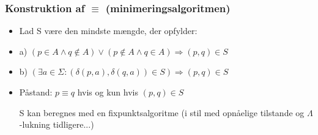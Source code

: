 \documentclass[]{beamer}
\begin{document}
\begin{frame}
\frametitle{Konstruktion af $\equiv$  (minimeringsalgoritmen)}
\begin{itemize}[<+->]
\item Lad S være den mindste mængde, der opfylder: 
\item a) $(p\in A \wedge  q\not\in A) \vee  (p\not\in A \wedge  q\in A) \Rightarrow (p, q)\in S$
\item b) $(\exists a\in \Sigma : (\delta (p, a), \delta (q, a))\in S)   \Rightarrow    (p, q)\in S$
\item
Påstand:  $p \equiv q$ hvis og kun hvis $(p, q)\in S$

S kan beregnes med en fixpunktsalgoritme 
(i stil med opnåelige tilstande og $\Lambda$-lukning tidligere...)
\end{itemize}
\end{frame}
\end{document}
